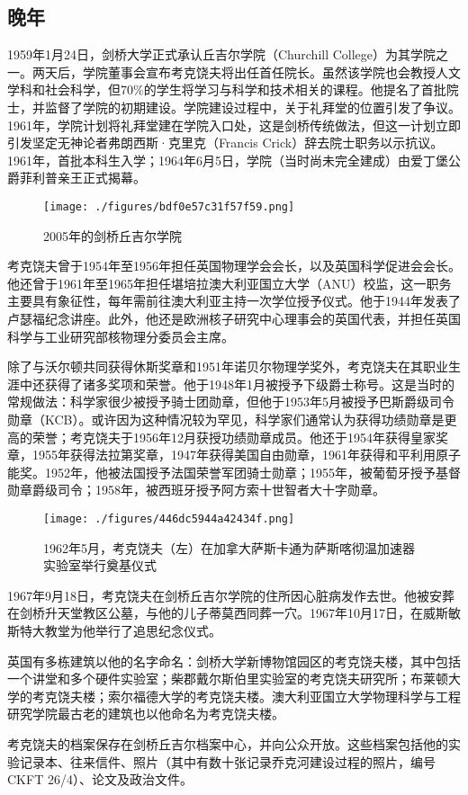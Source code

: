 \subsection{晚年}
1959年1月24日，剑桥大学正式承认丘吉尔学院（Churchill College）为其学院之一。两天后，学院董事会宣布考克饶夫将出任首任院长。虽然该学院也会教授人文学科和社会科学，但70\%的学生将学习与科学和技术相关的课程。他提名了首批院士，并监督了学院的初期建设。学院建设过程中，关于礼拜堂的位置引发了争议。1961年，学院计划将礼拜堂建在学院入口处，这是剑桥传统做法，但这一计划立即引发坚定无神论者弗朗西斯·克里克（Francis Crick）辞去院士职务以示抗议。1961年，首批本科生入学；1964年6月5日，学院（当时尚未完全建成）由爱丁堡公爵菲利普亲王正式揭幕。
\begin{figure}[ht]
\centering
\texttt{[image: ./figures/bdf0e57c31f57f59.png]}
\caption{2005年的剑桥丘吉尔学院} \label{fig_YHkrf_8}
\end{figure}
考克饶夫曾于1954年至1956年担任英国物理学会会长，以及英国科学促进会会长。他还曾于1961年至1965年担任堪培拉澳大利亚国立大学（ANU）校监，这一职务主要具有象征性，每年需前往澳大利亚主持一次学位授予仪式。他于1944年发表了卢瑟福纪念讲座。此外，他还是欧洲核子研究中心理事会的英国代表，并担任英国科学与工业研究部核物理分委员会主席。

除了与沃尔顿共同获得休斯奖章和1951年诺贝尔物理学奖外，考克饶夫在其职业生涯中还获得了诸多奖项和荣誉。他于1948年1月被授予下级爵士称号。这是当时的常规做法：科学家很少被授予骑士团勋章，但他于1953年5月被授予巴斯爵级司令勋章（KCB）。或许因为这种情况较为罕见，科学家们通常认为获得功绩勋章是更高的荣誉；考克饶夫于1956年12月获授功绩勋章成员。他还于1954年获得皇家奖章，1955年获得法拉第奖章，1947年获得美国自由勋章，1961年获得和平利用原子能奖。1952年，他被法国授予法国荣誉军团骑士勋章；1955年，被葡萄牙授予基督勋章爵级司令；1958年，被西班牙授予阿方索十世智者大十字勋章。
\begin{figure}[ht]
\centering
\texttt{[image: ./figures/446dc5944a42434f.png]}
\caption{1962年5月，考克饶夫（左）在加拿大萨斯卡通为萨斯喀彻温加速器实验室举行奠基仪式} \label{fig_YHkrf_9}
\end{figure}
1967年9月18日，考克饶夫在剑桥丘吉尔学院的住所因心脏病发作去世。他被安葬在剑桥升天堂教区公墓，与他的儿子蒂莫西同葬一穴。1967年10月17日，在威斯敏斯特大教堂为他举行了追思纪念仪式。

英国有多栋建筑以他的名字命名：剑桥大学新博物馆园区的考克饶夫楼，其中包括一个讲堂和多个硬件实验室；柴郡戴尔斯伯里实验室的考克饶夫研究所；布莱顿大学的考克饶夫楼；索尔福德大学的考克饶夫楼。澳大利亚国立大学物理科学与工程研究学院最古老的建筑也以他命名为考克饶夫楼。

考克饶夫的档案保存在剑桥丘吉尔档案中心，并向公众开放。这些档案包括他的实验记录本、往来信件、照片（其中有数十张记录乔克河建设过程的照片，编号CKFT 26/4）、论文及政治文件。